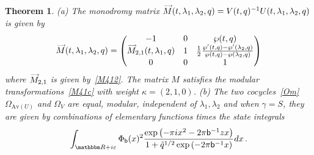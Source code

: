 \documentclass[12pt,reqno]{amsart}
\newtheorem{theorem}{Theorem}[section]
\theoremstyle{definition}
\def\BR{\mathbbm R}
\def\tq{\tilde{q}}
\def\ve{\varepsilon}
\def\be{\begin{equation}}
\def\ee{\end{equation}}
\def\sfb{\mathsf{b}}
\def\e{\bold e}
\def\Av{\mathrm{Av}}
\def\Om{\Omega}
\def\vM{\accentset{\longrightarrow}{M}}
\def\sfb{\mathsf{b}}
\begin{document}
\begin{theorem}
\label{thm.41b} 
{\rm (a)} The monodromy matrix $\vM(t,\lambda_{1},\lambda_{2},q)
= V(t,q)^{-1}U(t,\lambda_{1},\lambda_{2},q)$ is given by
\be
\label{M413}
\vM(t,\lambda_{1},\lambda_{2},q) =
\begin{pmatrix}
- 1 & 0 & \wp(t,q)\\
\vM_{2,1}(t,\lambda_{1},q) & 1 &
\frac{1}{2}\frac{\wp'(t,q)-\wp'(\lambda_{2},q)}{\wp(t,q)-\wp(\lambda_{2},q)}\\
0 & 0 & 1
\end{pmatrix}
\ee
where $\vM_{2,1}$ is given by~\eqref{M412}. The matrix $M$ satisfies the
modular transformations~\eqref{M41c} with weight $\kappa=(2,1,0)$. 
\newline
{\rm (b)}
The two cocycles~\eqref{Om} $\Om_{\Av(U)}$ and $\Om_{V}$ are equal,
modular, independent of $\lambda_{1},\lambda_{2}$ and when $\gamma=S$,
they are given by combinations of elementary functions times the state integrals
\be
\int_{\BR+i\ve}
\Phi_{\sfb}(x)^2
\frac{\exp\left(-\pi i x^{2}-2\pi\sfb^{-1}zx\right)}{1+\tq^{1/2}
  \exp\left(-2\pi\sfb^{-1}x\right)}dx\,.
\ee
\end{theorem}

\end{document}
